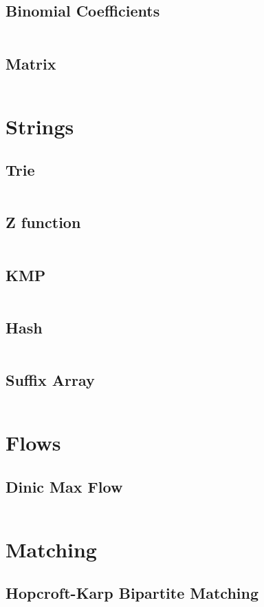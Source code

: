   \subsection{Binomial Coefficients}
    \inputminted{cpp}{library/maths/binomial_coefficient.hpp}
  \subsection{Matrix}
    \inputminted{cpp}{library/maths/matrix.hpp}

\section{Strings}
  \subsection{Trie}
    \inputminted{cpp}{library/strings/trie.hpp}
  \subsection{Z function}
    \inputminted{cpp}{library/strings/z_function.cpp}
  \subsection{KMP}
    \inputminted{cpp}{library/strings/kmp.hpp}
  \subsection{Hash}
    \inputminted{cpp}{library/strings/hash.hpp}
  \subsection{Suffix Array}
    \inputminted{cpp}{library/strings/suffix_array.hpp}

\section{Flows}
  \subsection{Dinic Max Flow}
    \inputminted{cpp}{library/flows/dinic.hpp}

\section{Matching}
  \subsection{Hopcroft-Karp Bipartite Matching}
    \inputminted{cpp}{library/matching/hopcroft_karp.hpp}

